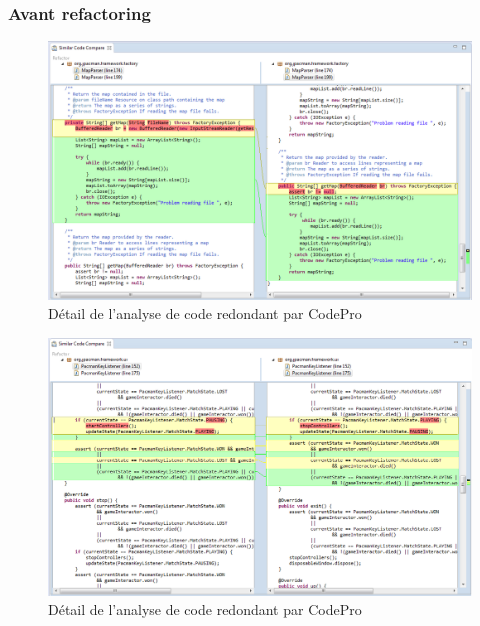 \documentclass[12pt,a4paper,final]{article}
\begin{document}
\subsubsection{Avant refactoring}
\begin{figure}[ht]
	\centering
	\includegraphics[width=\textwidth]{images/SimilarCode_1.png}
	\caption{\label{SimilarCode1}Détail de l'analyse de code redondant par CodePro}
\end{figure}

\begin{figure}[ht]
	\centering
	\includegraphics[width=\textwidth]{images/SimilarCode_2.png}
	\caption{\label{SimilarCode2}Détail de l'analyse de code redondant par CodePro}
\end{figure}
\end{document}
